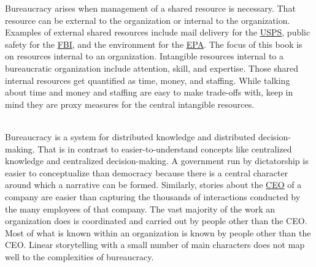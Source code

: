 Bureaucracy arises when management of a shared resource is necessary.
That resource can be external to the organization or internal to the organization. Examples of external shared resources include mail delivery for the \href{https://en.wikipedia.org/wiki/United_States_Postal_Service}{USPS}, 
\iftoggle{WPinmargin}{\marginpar{[Wikipedia] USPS}}{}
public safety for the \href{https://en.wikipedia.org/wiki/Federal_Bureau_of_Investigation}{FBI}, 
and the environment for the \href{https://en.wikipedia.org/wiki/United_States_Environmental_Protection_Agency}{EPA}. 
The focus of this book is on resources internal to an organization. Intangible resources internal to a bureaucratic organization include attention, skill, and expertise. Those shared internal resources get quantified as time, money, and staffing. While talking about time and money and staffing are easy to make trade-offs with, keep in mind they are proxy measures for the central intangible resources.

\ \\

Bureaucracy is a system for distributed knowledge and distributed decision-making. 
That is in contrast to easier-to-understand concepts like centralized knowledge and centralized decision-making. A government run by dictatorship is easier to conceptualize than democracy because there is a central character around which a narrative can be formed. Similarly, stories about the \href{https://en.wikipedia.org/wiki/Chief_executive_officer}{CEO} 
\iftoggle{WPinmargin}{\marginpar{[Wikipedia] Chief\\executive officer}}{}
of a company are easier than capturing the thousands of interactions conducted by the many employees of that company. The vast majority of the work an organization does is coordinated and carried out by people other than the CEO. Most of what is known within an organization is known by people other than the CEO. Linear storytelling with a small number of main characters does not map well to the complexities of bureaucracy. 


